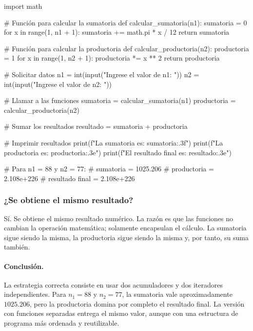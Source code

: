 \begin{solution}
\begin{pythonjupyter}
import math

# Función para calcular la sumatoria
def calcular_sumatoria(n1):
    sumatoria = 0
    for x in range(1, n1 + 1):
        sumatoria += math.pi * x / 12
    return sumatoria

# Función para calcular la productoria
def calcular_productoria(n2):
    productoria = 1
    for x in range(1, n2 + 1):
        productoria *= x ** 2
    return productoria

# Solicitar datos
n1 = int(input("Ingrese el valor de n1: "))
n2 = int(input("Ingrese el valor de n2: "))

# Llamar a las funciones
sumatoria = calcular_sumatoria(n1)
productoria = calcular_productoria(n2)

# Sumar los resultados
resultado = sumatoria + productoria

# Imprimir resultados
print(f"La sumatoria es: {sumatoria:.3f}")
print(f"La productoria es: {productoria:.3e}")
print(f"El resultado final es: {resultado:.3e}")

# Para n1 = 88 y n2 = 77:
# sumatoria = 1025.206
# productoria = 2.108e+226
# resultado final = 2.108e+226
\end{pythonjupyter}

\subsubsection*{¿Se obtiene el mismo resultado?}

Sí. Se obtiene el mismo resultado numérico. La razón es que las funciones no cambian la operación matemática; solamente encapsulan el cálculo. La sumatoria sigue siendo la misma, la productoria sigue siendo la misma y, por tanto, su suma también.

\paragraph{Conclusión.}
La estrategia correcta consiste en usar dos acumuladores y dos iteradores independientes. Para \(n_1=88\) y \(n_2=77\), la sumatoria vale aproximadamente \(1025.206\), pero la productoria domina por completo el resultado final. La versión con funciones separadas entrega el mismo valor, aunque con una estructura de programa más ordenada y reutilizable.

\end{solution}
